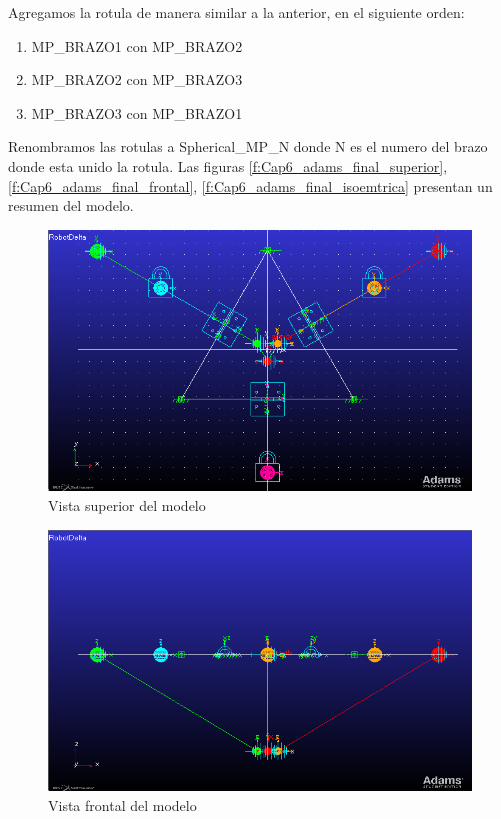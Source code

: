         Agregamos la rotula de manera similar a la anterior, en el siguiente orden:
        
        \begin{enumerate}
            \item MP\_BRAZO1 con MP\_BRAZO2
            \item MP\_BRAZO2 con MP\_BRAZO3
            \item MP\_BRAZO3 con MP\_BRAZO1
        \end{enumerate}
        
        Renombramos las rotulas a Spherical\_MP\_N donde N es el numero del brazo donde esta unido la rotula. Las figuras \eqref{f:Cap6_adams_final_superior}, \eqref{f:Cap6_adams_final_frontal}, \eqref{f:Cap6_adams_final_isoemtrica} presentan un resumen del modelo.
        
        \begin{figure}[H]
            \centering
            \includegraphics[width=1\linewidth]{Main/Chapter6/Images6/adams/base-movil/superior.png}
            \caption{Vista superior del modelo}
            \label{f:Cap6_adams_final_superior}
        \end{figure}
        
        \begin{figure}[H]
            \centering
            \includegraphics[width=1\linewidth]{Main/Chapter6/Images6/adams/base-movil/frontal.png}
            \caption{Vista frontal del modelo}
            \label{f:Cap6_adams_final_frontal}
        \end{figure}
        
